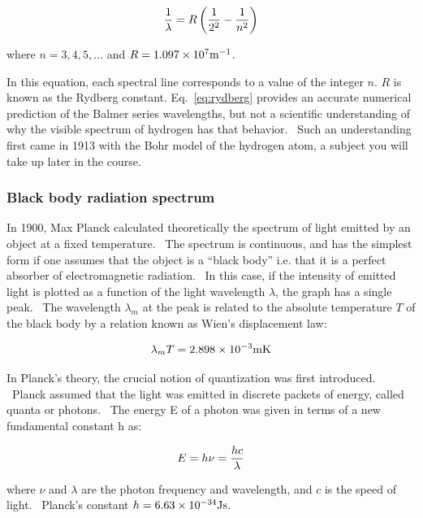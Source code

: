 \documentclass{article}
\begin{document}
\begin{equation}
{1 \over \lambda} = R \left( {1 \over 2^2} - {1 \over n^2} \right)
\label{eq:rydberg}
\end{equation}

where $n = 3, 4, 5,\ldots$ and $ R = 1.097 \times 10^7 {\rm m}^{-1}$.

In this equation, each spectral line corresponds to a value of the 
integer $n$.  $R$ is known as the Rydberg constant.  Eq.~\ref{eq:rydberg} provides
an accurate numerical prediction of the Balmer series wavelengths, but
not a scientific understanding of why the visible spectrum of hydrogen
has that behavior. \ Such an understanding first came in 1913 with the
Bohr model of the hydrogen atom, a subject you will take up later in
the course.

\subsubsection{Black body radiation spectrum}
In 1900, Max Planck calculated theoretically the spectrum of light
emitted by an object at a fixed temperature. \ The spectrum is
continuous, and has the simplest form if one assumes that the object is
a ``black body'' i.e. that it is a
perfect absorber of electromagnetic radiation. \ In this case, if the
intensity of emitted light is plotted as a function of the light
wavelength ${\lambda}$, the graph has a single peak. \ The wavelength
${\lambda}_m$ at the peak is related to the absolute
temperature $T$ of the black body by a relation known as
Wien's displacement law:

\begin{equation}
\lambda_m T = 2.898 \times 10^{-3} {\rm m} {\rm K}
\label{eq:wein}
\end{equation}

In Planck's theory, the crucial notion of quantization
was first introduced. \ Planck assumed that the light was emitted in
discrete packets of energy, called quanta or photons. \ The energy E of
a photon was given in terms of a new fundamental constant h as:

\begin{equation}
 E = h\nu = {hc \over \lambda}
\label{eq:plank}
\end{equation}

where $\nu$ and $\lambda$ are the photon frequency and wavelength, and $c$
is the speed of light. \ Planck's constant $h = 6.63 \times 10^{-34} {\rm J} {\rm s}$.
\end{document}
